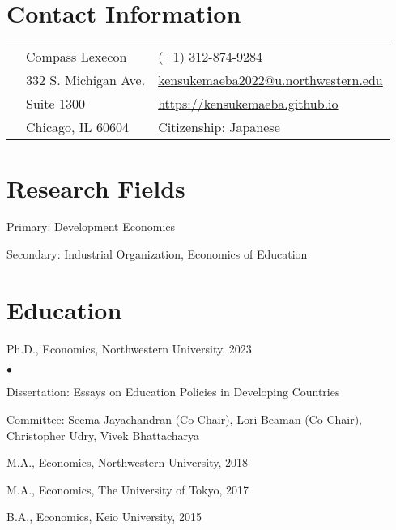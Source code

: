 \documentclass[margin,line]{res}
\newenvironment{list1}{
  \begin{list}{\ding{113}}{%
      \setlength{\itemsep}{.025in}
      \setlength{\parsep}{0in} \setlength{\parskip}{0in}
      \setlength{\topsep}{0in} \setlength{\partopsep}{0in}
      \setlength{\leftmargin}{0.17in}}}{\end{list}}
\newenvironment{list2}{
  \begin{list}{$\bullet$}{%
      \setlength{\itemsep}{0in}
      \setlength{\parsep}{0in} \setlength{\parskip}{0in}
      \setlength{\topsep}{0in} \setlength{\partopsep}{0in}
      \setlength{\leftmargin}{0.2in}}}{\end{list}}
\begin{document}

~\\
~\\

\begin{resume}
\thispagestyle{plain} %

\section{Contact Information}
\vspace{.05in}
\begin{tabular}{@{}p{0.20in}p{2.75in}p{2.75in}}
 & Compass Lexecon           & (+1) 312-874-9284 \\
 & 332 S. Michigan Ave.  &  \href{mailto: kensukemaeba2022@u.northwestern.edu}{kensukemaeba2022@u.northwestern.edu} \\
 & Suite 1300 &  \href{https://kensukemaeba.github.io}{https://kensukemaeba.github.io}\\
 & Chicago, IL 60604  & Citizenship: Japanese
\end{tabular}

\section{Research Fields}
\begin{list1}
\item[] Primary: Development Economics
\item[] Secondary: Industrial Organization, Economics of Education
\vspace*{.05in}
\end{list1}

\section{ Education}\begin{tiny}

\end{tiny}
\begin{list1}
\item[] Ph.D., Economics, Northwestern University, 2023
	\begin{list2}
		\item[] Dissertation: Essays on Education Policies in Developing Countries
		\item[] Committee: Seema Jayachandran (Co-Chair), Lori Beaman (Co-Chair), Christopher Udry, Vivek Bhattacharya
	\end{list2}
\item[] M.A., Economics, Northwestern University, 2018
\item[] M.A., Economics, The University of Tokyo, 2017
\item[] B.A., Economics, Keio University, 2015
\end{list1}


\end{resume}
\end{document}
